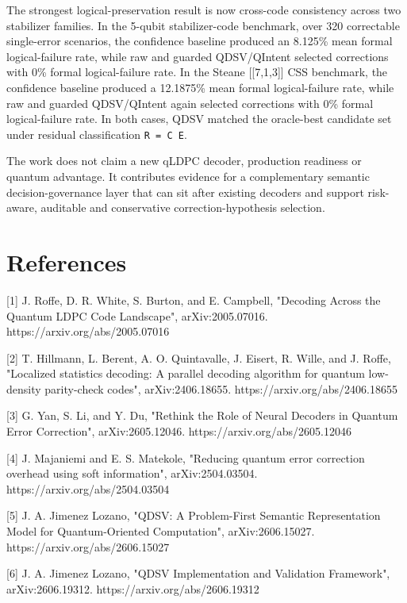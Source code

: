 \documentclass[11pt]{article}
\begin{document}
The strongest logical-preservation result is now cross-code consistency across two stabilizer families. In the 5-qubit stabilizer-code benchmark, over 320 correctable single-error scenarios, the confidence baseline produced an 8.125\% mean formal logical-failure rate, while raw and guarded QDSV/QIntent selected corrections with 0\% formal logical-failure rate. In the Steane [[7,1,3]] CSS benchmark, the confidence baseline produced a 12.1875\% mean formal logical-failure rate, while raw and guarded QDSV/QIntent again selected corrections with 0\% formal logical-failure rate. In both cases, QDSV matched the oracle-best candidate set under residual classification \texttt{R = C E}.


The work does not claim a new qLDPC decoder, production readiness or quantum advantage. It contributes evidence for a complementary semantic decision-governance layer that can sit after existing decoders and support risk-aware, auditable and conservative correction-hypothesis selection.


\section{References}

[1] J. Roffe, D. R. White, S. Burton, and E. Campbell, "Decoding Across the Quantum LDPC Code Landscape", arXiv:2005.07016. https://arxiv.org/abs/2005.07016


[2] T. Hillmann, L. Berent, A. O. Quintavalle, J. Eisert, R. Wille, and J. Roffe, "Localized statistics decoding: A parallel decoding algorithm for quantum low-density parity-check codes", arXiv:2406.18655. https://arxiv.org/abs/2406.18655


[3] G. Yan, S. Li, and Y. Du, "Rethink the Role of Neural Decoders in Quantum Error Correction", arXiv:2605.12046. https://arxiv.org/abs/2605.12046


[4] J. Majaniemi and E. S. Matekole, "Reducing quantum error correction overhead using soft information", arXiv:2504.03504. https://arxiv.org/abs/2504.03504


[5] J. A. Jimenez Lozano, "QDSV: A Problem-First Semantic Representation Model for Quantum-Oriented Computation", arXiv:2606.15027. https://arxiv.org/abs/2606.15027


[6] J. A. Jimenez Lozano, "QDSV Implementation and Validation Framework", arXiv:2606.19312. https://arxiv.org/abs/2606.19312
\end{document}
